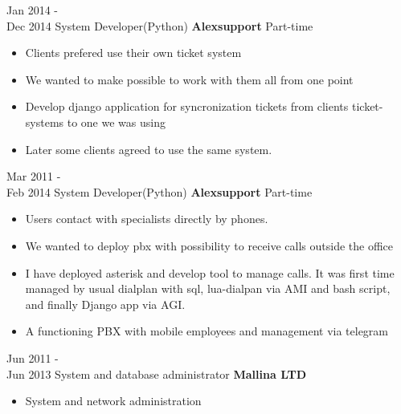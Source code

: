 \documentclass[a4paper]{twentysecondcv} %
\begin{document}
\begin{twenty}
    \twentyitem
        {Jan 2014 - \\ Dec 2014}
        {System Developer(Python)}
        {\textbf{Alexsupport}}
        {Part-time}
        {
            \begin{itemize}
                \item Clients prefered use their own ticket system
                \item We wanted to make possible to work with them all from one point
                \item Develop django application for syncronization tickets from clients ticket-systems to one we was using
                \item Later some clients agreed to use the same system.
            \end{itemize}
        }
    \twentyitem
        {Mar 2011 - \\ Feb 2014}
        {System Developer(Python) }
        {\textbf{Alexsupport}}
        {Part-time}
        {
            \begin{itemize}
                \item Users contact with specialists directly by phones.
                \item We wanted to deploy pbx with possibility to receive calls outside the office
                \item I have deployed asterisk and develop tool to manage calls.
                It was first time managed by usual dialplan with sql,
                lua-dialpan via AMI and bash script, and finally Django app via AGI.
                \item A functioning PBX with mobile employees and management via telegram
            \end{itemize}
        }

    \twentyitem
        {Jun 2011 - \\ Jun 2013}
        {System and database administrator }
        {\textbf{Mallina LTD}}
        {}
        {
            \begin{itemize}
                \item System and network administration
            \end{itemize}
        }


\end{twenty}
\end{document}
